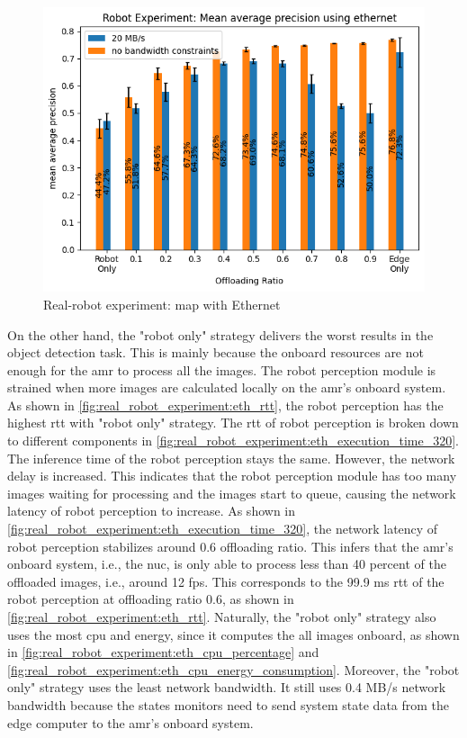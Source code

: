 \begin{figure}
    \centering
    \includegraphics[width=\linewidth]{figures/experiment/real_robot/eth/map.png}
    \caption{Real-robot experiment: \gls{map} with Ethernet}
    \label{fig:real_robot_experiment:eth_map}
\end{figure}

On the other hand, the "robot only" strategy delivers the worst results in the object detection task. This is mainly because the onboard resources are not enough for the \gls{amr} to process all the images. The robot perception module is strained when more images are calculated locally on the \gls{amr}'s onboard system. As shown in \cref{fig:real_robot_experiment:eth_rtt}, the robot perception has the highest \gls{rtt} with "robot only" strategy. The \gls{rtt} of robot perception is broken down to different components in \cref{fig:real_robot_experiment:eth_execution_time_320}. The inference time of the robot perception stays the same. However, the network delay is increased. This indicates that the robot perception module has too many images waiting for processing and the images start to queue, causing the network latency of robot perception to increase. As shown in \cref{fig:real_robot_experiment:eth_execution_time_320}, the network latency of robot perception stabilizes around 0.6 offloading ratio. This infers that the \gls{amr}'s onboard system, i.e., the \gls{nuc}, is only able to process less than 40 percent of the offloaded images, i.e., around 12 \gls{fps}. This corresponds to the 99.9 ms \gls{rtt} of the robot perception at offloading ratio 0.6, as shown in \cref{fig:real_robot_experiment:eth_rtt}. Naturally, the "robot only" strategy also uses the most \gls{cpu} and energy, since it computes the all images onboard, as shown in \cref{fig:real_robot_experiment:eth_cpu_percentage} and \cref{fig:real_robot_experiment:eth_cpu_energy_consumption}. Moreover, the "robot only" strategy uses the least network bandwidth. It still uses 0.4 MB/s network bandwidth because the states monitors need to send system state data from the edge computer to the \gls{amr}'s onboard system.

